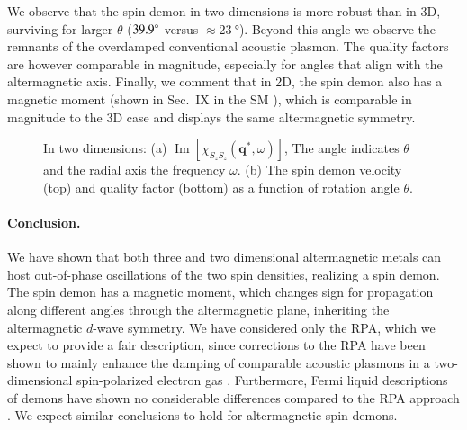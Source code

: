 \documentclass[aps,prl,reprint,twocolumns,superscriptaddress]{revtex4-2}
\DeclareMathOperator{\Imm}{Im}
\begin{document}
	
	We observe that the spin demon in two dimensions is more robust than in 3D, surviving for larger $\theta$ ($\SI{39.9}{\degree}$ versus $\approx\SI{23}{\degree}$). Beyond this angle we observe the remnants of the overdamped conventional acoustic plasmon. The quality factors are however comparable in magnitude, especially for angles that align with the altermagnetic axis. Finally, we comment that in 2D, the spin demon also has a magnetic moment (shown in Sec.~IX in the SM \cite{Note1}), which is comparable in magnitude to the 3D case and displays the same altermagnetic symmetry.
	
	\begin{figure}
		\caption{In two dimensions: (a) $\Imm[\chi_{S_zS_z}(\bm q^*,\omega)]$, The angle indicates $\theta$ and the radial axis the frequency $\omega$. (b) The spin demon velocity (top) and quality factor (bottom) as a function of rotation angle  $\theta$. \label{fig:2D} }
	\end{figure}
	

	
	
	\paragraph{Conclusion. }We have shown that both three and two dimensional altermagnetic metals can host out-of-phase oscillations of the two spin densities, realizing a spin demon. 
	The spin demon has a magnetic moment, which changes sign for propagation along different angles through the altermagnetic plane, inheriting the altermagnetic $d$-wave symmetry.
	We have considered only the RPA, which we expect to provide a fair description, since corrections to the RPA have been shown to mainly enhance the damping of comparable acoustic plasmons in a two-dimensional spin-polarized electron gas \cite{kreilExcitationsSpinpolarizedTwodimensional2015}. Furthermore, Fermi liquid descriptions of demons have shown no considerable differences compared to the RPA approach \cite{afanasievAcousticPlasmonsIsotropic2022}. We expect similar conclusions to hold for altermagnetic spin demons. 
	
\end{document}
